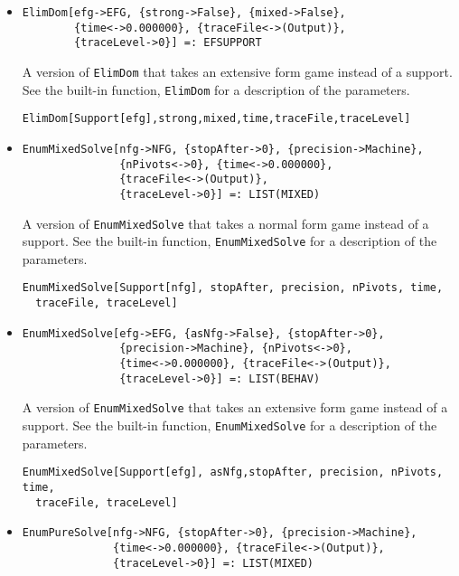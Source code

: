 \begin{itemize}
\item{}
\protect \large \begin{verbatim}
ElimDom[efg->EFG, {strong->False}, {mixed->False}, 
        {time<->0.000000}, {traceFile<->(Output)}, 
        {traceLevel->0}] =: EFSUPPORT 
\end{verbatim}\normalsize

\bd 
A version of \verb+ElimDom+ that takes an extensive form game instead
of a support.  See the built-in function, \verb+ElimDom+ for a
description of the parameters.
\begin{verbatim}
ElimDom[Support[efg],strong,mixed,time,traceFile,traceLevel]
\end{verbatim} 
\ed

\item{}
\protect \large \begin{verbatim}
EnumMixedSolve[nfg->NFG, {stopAfter->0}, {precision->Machine}, 
               {nPivots<->0}, {time<->0.000000}, 
               {traceFile<->(Output)}, 
               {traceLevel->0}] =: LIST(MIXED) 
\end{verbatim}\normalsize

\bd 
A version of \verb+EnumMixedSolve+ that takes a normal form game instead
of a support.  See the built-in function, \verb+EnumMixedSolve+ for a
description of the parameters.
\begin{verbatim}
EnumMixedSolve[Support[nfg], stopAfter, precision, nPivots, time, 
  traceFile, traceLevel]
\end{verbatim} 
\ed

\item{}
\protect \large \begin{verbatim}
EnumMixedSolve[efg->EFG, {asNfg->False}, {stopAfter->0}, 
               {precision->Machine}, {nPivots<->0}, 
               {time<->0.000000}, {traceFile<->(Output)}, 
               {traceLevel->0}] =: LIST(BEHAV) 
\end{verbatim}\normalsize

\bd 
A version of \verb+EnumMixedSolve+ that takes an extensive form game instead
of a support.  See the built-in function, \verb+EnumMixedSolve+ for a
description of the parameters.
\begin{verbatim}
EnumMixedSolve[Support[efg], asNfg,stopAfter, precision, nPivots, time,
  traceFile, traceLevel]
\end{verbatim} 
\ed

\item{}
\protect \large \begin{verbatim}
EnumPureSolve[nfg->NFG, {stopAfter->0}, {precision->Machine}, 
              {time<->0.000000}, {traceFile<->(Output)}, 
              {traceLevel->0}] =: LIST(MIXED) 
\end{verbatim}\normalsize


\end{itemize}
